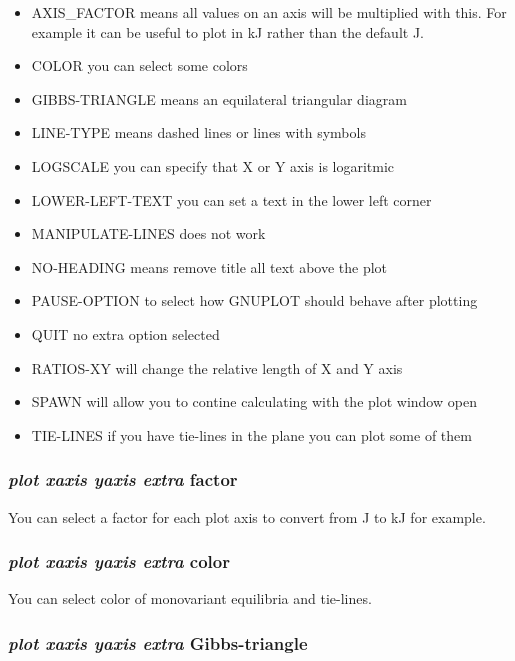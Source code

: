 \documentclass[11pt]{article}
\begin{document}
\begin{itemize}
\item AXIS\_FACTOR means all values on an axis will be multiplied with
  this.  For example it can be useful to plot in kJ rather than the default J.
\item COLOR you can select some colors
\item GIBBS-TRIANGLE means an equilateral triangular diagram
\item LINE-TYPE means dashed lines or lines with symbols
\item LOGSCALE you can specify that X or Y axis is logaritmic
\item LOWER-LEFT-TEXT you can set a text in the lower left corner
\item MANIPULATE-LINES does not work
\item NO-HEADING means remove title all text above the plot
\item PAUSE-OPTION to select how GNUPLOT should behave after plotting
\item QUIT no extra option selected
\item RATIOS-XY will change the relative length of X and Y axis
\item SPAWN will allow you to contine calculating with the plot window open
\item TIE-LINES if you have tie-lines in the plane you can plot some of them
\end{itemize}

\hypertarget{Plot extra factor}{}
\subsubsection{{\em plot xaxis yaxis extra} factor}

You can select a factor for each plot axis to convert from J to kJ for
example.

\hypertarget{Plot color}{}
\subsubsection{{\em plot xaxis yaxis extra} color}

You can select color of monovariant equilibria and tie-lines.

\hypertarget{Plot Gibbs triangle}{}
\subsubsection{{\em plot xaxis yaxis extra} Gibbs-triangle}
\end{document}
